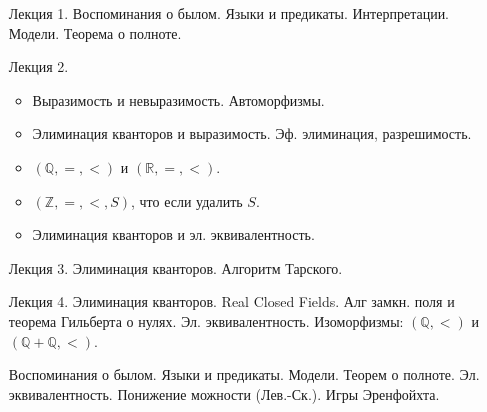 \begin{enumerate}
    \item[Лекция 1.] Воспоминания о былом. Языки и предикаты. Интерпретации. Модели. Теорема о полноте.
    \item[Лекция 2.] 
        \begin{itemize}
            \item Выразимость и невыразимость. Автоморфизмы.
            \item Элиминация кванторов и выразимость. Эф. элиминация, разрешимость.
            \item $(\mathbb{Q}, =, <)$ и $(\mathbb{R}, =, <)$.
            \item $(\mathbb{Z}, =, <, S)$, что если удалить $S$.
            \item Элиминация кванторов и эл. эквивалентность.
        \end{itemize}
    \item[Лекция 3.] Элиминация кванторов. Алгоритм Тарского.
    \item[Лекция 4.] Элиминация кванторов. Real Closed Fields. Алг замкн. поля и теорема Гильберта о нулях.
        Эл. эквивалентность. Изоморфизмы: $(\mathbb{Q}, <)$ и $(\mathbb{Q} + \mathbb{Q}, <)$.
        

        
        Воспоминания о былом. Языки и предикаты. Модели. Теорем о полноте.
        Эл. эквивалентность. Понижение можности (Лев.-Ск.). Игры Эренфойхта.
\end{enumerate}